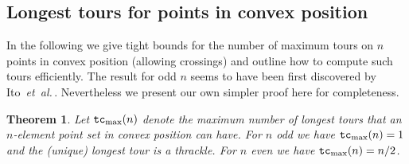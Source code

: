 \documentclass[11pt]{article}
\newtheorem{theorem}{Theorem}
\def\etal{{\it et~al.}\,}
\begin{document}
\subsection{Longest tours for points in convex position}

In the following we give tight bounds for the number of maximum tours
on $n$ points in convex position (allowing crossings) and outline how to compute such
tours efficiently. The result for odd $n$ seems to have been first
discovered by Ito~\etal\cite{IUY01}. Nevertheless we present
our own simpler proof here for completeness.

\begin{theorem} \label{Thm-T}
Let ${\tt tc}_{\rm max}(n)$
denote the maximum number of longest tours that
an $n$-element point set in convex position can have.
For $n$ odd we have ${\tt tc}_{\rm max}(n)=1$ and the (unique) longest tour is a
thrackle. For $n$ even we have ${\tt tc}_{\rm max}(n)= n/2$.
\end{theorem}
\end{document}
